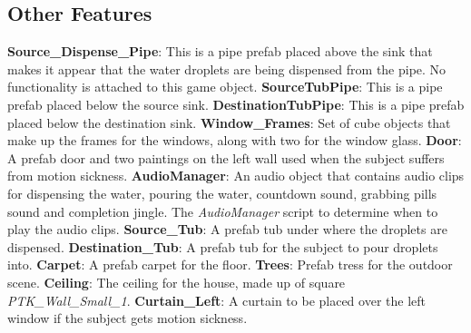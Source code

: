 \documentclass{article}
\begin{document}
\subsection{Other Features} %
\textbf{Source\_Dispense\_Pipe}: This is a pipe prefab placed above the sink that makes it appear that the water droplets are being dispensed from the pipe. No functionality is attached to this game object.\newline \newline
\textbf{SourceTubPipe}: This is a pipe prefab placed below the source sink.\newline \newline
\textbf{DestinationTubPipe}: This is a pipe prefab placed below the destination sink.\newline \newline
\textbf{Window\_Frames}: Set of cube objects that make up the frames for the windows, along with two for the window glass.\newline \newline
\textbf{Door}: A prefab door and two paintings on the left wall used when the subject suffers from motion sickness.\newline \newline
\textbf{AudioManager}: An audio object that contains audio clips for dispensing the water, pouring the water, countdown sound, grabbing pills sound and completion jingle. The \textit{AudioManager} script to determine when to play the audio clips.\newline \newline
\textbf{Source\_Tub}: A prefab tub under where the droplets are dispensed.\newline \newline
\textbf{Destination\_Tub}: A prefab tub for the subject to pour droplets into.\newline \newline
\textbf{Carpet}: A prefab carpet for the floor.\newline \newline
\textbf{Trees}: Prefab tress for the outdoor scene. \newline \newline
\textbf{Ceiling}: The ceiling for the house, made up of square \textit{PTK\_Wall\_Small\_1}. \newline \newline
\textbf{Curtain\_Left}: A curtain to be placed over the left window if the subject gets motion sickness. \newline \newline
\end{document}
